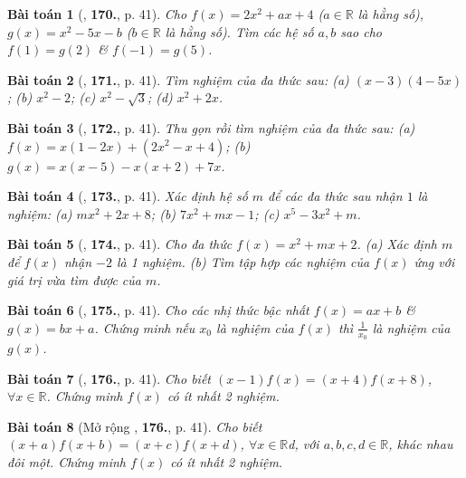 \documentclass{article}
\numberwithin{equation}{section}
\newtheorem{baitoan}{Bài toán}
\begin{document}
\begin{baitoan}[\cite{Tuyen_Toan_7}, \textbf{170.}, p. 41]
	Cho $f(x) = 2x^2 + ax + 4$ ($a\in\mathbb{R}$ là hằng số), $g(x) = x^2 - 5x - b$ ($b\in\mathbb{R}$ là hằng số). Tìm các hệ số $a,b$ sao cho $f(1) = g(2)$ \& $f(-1) = g(5)$.
\end{baitoan}

\begin{baitoan}[\cite{Tuyen_Toan_7}, \textbf{171.}, p. 41]
	Tìm nghiệm của đa thức sau: (a) $(x - 3)(4 - 5x)$; (b) $x^2 - 2$; (c) $x^2 - \sqrt{3}$; (d) $x^2 + 2x$.
\end{baitoan}

\begin{baitoan}[\cite{Tuyen_Toan_7}, \textbf{172.}, p. 41]
	Thu gọn rồi tìm nghiệm của đa thức sau: (a) $f(x) = x(1 - 2x) + (2x^2 - x + 4)$; (b) $g(x) = x(x - 5) - x(x + 2) + 7x$.
\end{baitoan}

\begin{baitoan}[\cite{Tuyen_Toan_7}, \textbf{173.}, p. 41]
	Xác định hệ số $m$ để các đa thức sau nhận $1$ là nghiệm: (a) $mx^2 + 2x + 8$; (b) $7x^2 + mx - 1$; (c) $x^5 - 3x^2 + m$.
\end{baitoan}

\begin{baitoan}[\cite{Tuyen_Toan_7}, \textbf{174.}, p. 41]
	Cho đa thức $f(x) = x^2 + mx + 2$. (a) Xác định $m$ để $f(x)$ nhận $-2$ là 1 nghiệm. (b) Tìm tập hợp các nghiệm của $f(x)$ ứng với giá trị vừa tìm được của $m$.
\end{baitoan}

\begin{baitoan}[\cite{Tuyen_Toan_7}, \textbf{175.}, p. 41]
	Cho các nhị thức bậc nhất $f(x) = ax + b$ \& $g(x) = bx + a$. Chứng minh nếu $x_0$ là nghiệm của $f(x)$ thì $\frac{1}{x_0}$ là nghiệm của $g(x)$.
\end{baitoan}

\begin{baitoan}[\cite{Tuyen_Toan_7}, \textbf{176.}, p. 41]
	Cho biết $(x - 1)f(x) = (x + 4)f(x + 8)$, $\forall x\in\mathbb{R}$. Chứng minh $f(x)$ có ít nhất 2 nghiệm.
\end{baitoan}

\begin{baitoan}[Mở rộng \cite{Tuyen_Toan_7}, \textbf{176.}, p. 41]
	Cho biết $(x + a)f(x + b) = (x + c)f(x + d)$, $\forall x\in\mathbb{R}$d, với $a,b,c,d\in\mathbb{R}$, khác nhau đôi một. Chứng minh $f(x)$ có ít nhất 2 nghiệm.
\end{baitoan}
\end{document}
